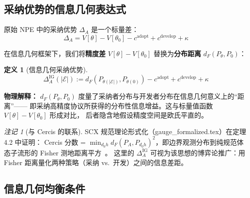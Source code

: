 \documentclass[12pt,a4paper]{article}
\theoremstyle{definition}
\newtheorem{definition}{定义}[section]
\theoremstyle{remark}
\newtheorem{remark}{注记}[section]
\begin{document}
\subsection{采纳优势的信息几何表达式}

原始 NPE 中的采纳优势 $\Delta_A$ 是一个标量差：
\begin{equation}
    \Delta_A = V[\theta] - V[\theta_0] - c^{\text{adopt}} + c^{\text{develop}} + \kappa
\end{equation}

在信息几何框架下，我们将\textbf{精度差} $V[\theta] - V[\theta_0]$ 替换为\textbf{分布距离} $d_F(P_\theta, P_0)$：
\begin{definition}[信息几何采纳优势]
\begin{equation}
    \Delta_A^{\text{IG}}(|\mathcal{E}|) := d_F(P_{\theta(|\mathcal{E}|)}, P_{\theta(0)}) - c^{\text{adopt}} + c^{\text{develop}} + \kappa \label{eq:Delta_IG}
\end{equation}
\end{definition}

\textbf{物理解释：} $d_F(P_\theta, P_0)$ 度量了采纳者分布与开发者分布在信息几何意义上的“距离”——
即采纳高精度协议所获得的分布性信息增益。这与标量值函数 $V[\theta] - V[\theta_0]$ 形成对比，
后者隐含地假设精度空间是欧氏平直的。

\begin{remark}[与 Cercis 的联系]
SCX 规范理论形式化（gauge\_formalized.tex）在定理 4.2 中证明：
Cercis 分数 = $\min_{d_0 h} d_F(P_A, P_{d_0 h})^2$，即边界观测分布到纯规范体态子流形的 Fisher 测地距离平方~\cite{scx_gauge_formalized}。
这里的 $\Delta_A^{\text{IG}}$ 可视为该思想的博弈论推广：用 Fisher 距离量化两种策略（采纳 vs.\ 开发）之间的信息差距。
\end{remark}

\subsection{信息几何均衡条件}
\end{document}

